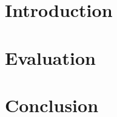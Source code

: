 


\maketitle
\thispagestyle{empty}

\begin{abstract}
    
\end{abstract}

\section{Introduction}
    



\section{Evaluation}
    

\section{Conclusion}
    


{\small


}

